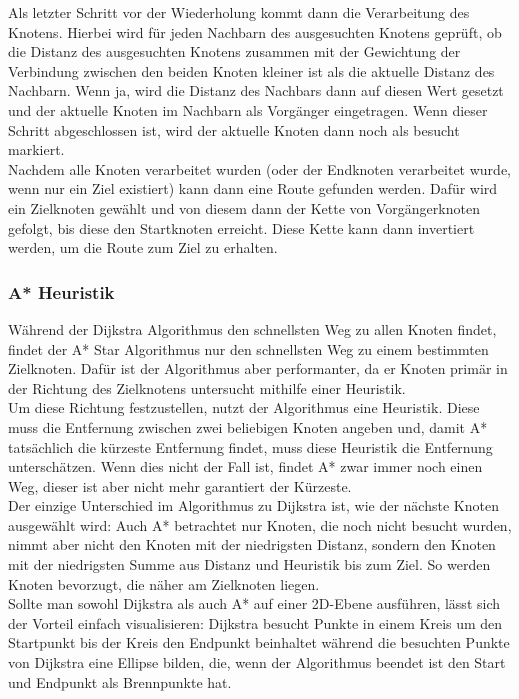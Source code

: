 Als letzter Schritt vor der Wiederholung kommt dann die Verarbeitung des Knotens.
Hierbei wird für jeden Nachbarn des ausgesuchten Knotens geprüft, ob die Distanz des ausgesuchten Knotens zusammen mit der
Gewichtung der Verbindung zwischen den beiden Knoten kleiner ist als die aktuelle Distanz des Nachbarn.
Wenn ja, wird die Distanz des Nachbars dann auf diesen Wert gesetzt und der aktuelle Knoten im Nachbarn als Vorgänger
eingetragen.
Wenn dieser Schritt abgeschlossen ist, wird der aktuelle Knoten dann noch als besucht markiert.\\

Nachdem alle Knoten verarbeitet wurden (oder der Endknoten verarbeitet wurde, wenn nur ein Ziel existiert) kann dann eine
Route gefunden werden.
Dafür wird ein Zielknoten gewählt und von diesem dann der Kette von Vorgängerknoten gefolgt, bis diese den Startknoten
erreicht.
Diese Kette kann dann invertiert werden, um die Route zum Ziel zu erhalten.\\
\subsubsection{A* Heuristik}\label{subsubsec:astar}
Während der Dijkstra Algorithmus den schnellsten Weg zu allen Knoten findet, findet der A* Star Algorithmus nur den
schnellsten Weg zu einem bestimmten Zielknoten.
Dafür ist der Algorithmus aber performanter, da er Knoten primär in der Richtung des Zielknotens untersucht mithilfe
einer Heuristik.\\

Um diese Richtung festzustellen, nutzt der Algorithmus eine Heuristik.
Diese muss die Entfernung zwischen zwei beliebigen Knoten angeben und, damit A* tatsächlich die kürzeste Entfernung
findet, muss diese Heuristik die Entfernung unterschätzen.
Wenn dies nicht der Fall ist, findet A* zwar immer noch einen Weg, dieser ist aber nicht mehr garantiert der Kürzeste.\\

Der einzige Unterschied im Algorithmus zu Dijkstra ist, wie der nächste Knoten ausgewählt wird: Auch A* betrachtet nur
Knoten, die noch nicht besucht wurden, nimmt aber nicht den Knoten mit der niedrigsten Distanz, sondern den Knoten mit der
niedrigsten Summe aus Distanz und Heuristik bis zum Ziel.
So werden Knoten bevorzugt, die näher am Zielknoten liegen.\\

Sollte man sowohl Dijkstra als auch A* auf einer 2D-Ebene ausführen, lässt sich der Vorteil einfach visualisieren:
Dijkstra besucht Punkte in einem Kreis um den Startpunkt bis der Kreis den Endpunkt beinhaltet während die besuchten Punkte
von Dijkstra eine Ellipse bilden, die, wenn der Algorithmus beendet ist den Start und Endpunkt als Brennpunkte hat.\\

